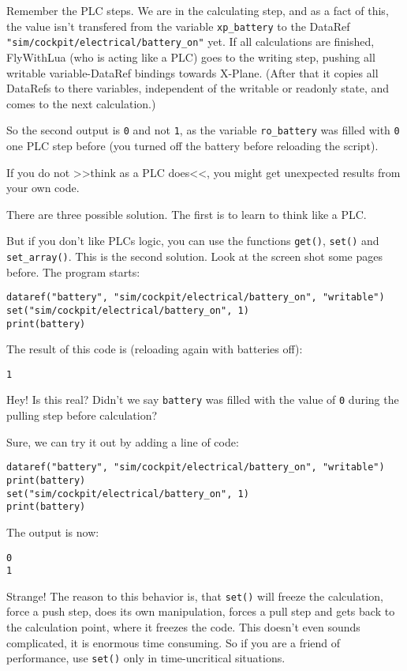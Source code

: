 \documentclass[11pt,parskip=half,a4paper]{scrartcl}
\begin{document}
Remember the PLC steps. We are in the calculating step, and as a fact of this, the value isn't transfered from the variable \verb|xp_battery| to the DataRef \verb|"sim/cockpit/electrical/battery_on"| yet. If all calculations are finished, FlyWithLua (who is acting like a PLC) goes to the writing step, pushing all writable variable-DataRef bindings towards X-Plane. (After that it copies all DataRefs to there variables, independent of the writable or readonly state, and comes to the next calculation.)

So the second output is \verb|0| and not \verb|1|, as the variable \verb|ro_battery| was filled with \verb|0| one PLC step before (you turned off the battery before reloading the script).

If you do not >>think as a PLC does<<, you might get unexpected results from your own code.

There are three possible solution. The first is to learn to think like a PLC.

\newpage
But if you don't like PLCs logic, you can use the functions \verb|get()|, \verb|set()| and \verb|set_array()|. This is the second solution. Look at the screen shot some pages before. The program starts:

\begin{lstlisting}
dataref("battery", "sim/cockpit/electrical/battery_on", "writable")
set("sim/cockpit/electrical/battery_on", 1)
print(battery)
\end{lstlisting}

The result of this code is (reloading again with batteries off):

\verb|1|

Hey! Is this real? Didn't we say \verb|battery| was filled with the value of \verb|0| during the pulling step before calculation?

Sure, we can try it out by adding a line of code:

\begin{lstlisting}
dataref("battery", "sim/cockpit/electrical/battery_on", "writable")
print(battery)
set("sim/cockpit/electrical/battery_on", 1)
print(battery)
\end{lstlisting}

The output is now:

\verb|0|\\
\verb|1|

Strange! The reason to this behavior is, that \verb|set()| will freeze the calculation, force a push step, does its own manipulation, forces a pull step and gets back to the calculation point, where it freezes the code. This doesn't even sounds complicated, it is enormous time consuming. So if you are a friend of performance, use \verb|set()| only in time-uncritical situations.
\end{document}
